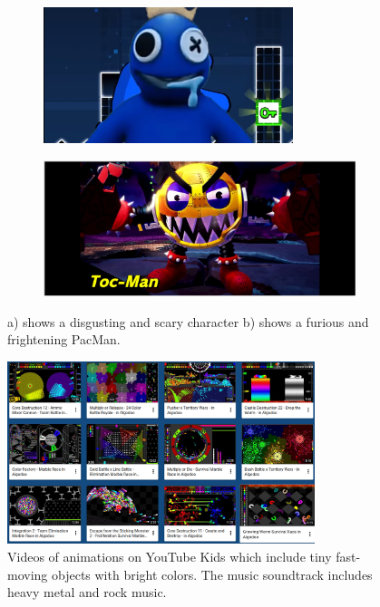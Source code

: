 \begin{figure}[!htb]
  \centering

  \begin{subfigure}{0.45\textwidth}
    \centering
    \includegraphics[width=0.8\textwidth]{figures/malicious5.png}
    \caption{}
    \label{fig:image_disgust}
  \end{subfigure}
  \hfill
  \begin{subfigure}{0.45\textwidth}
    \centering
    \includegraphics[width=\textwidth]{figures/malicious9.png}
    \caption{}
    \label{fig:image_angry}
  \end{subfigure}

  \caption{a) shows a disgusting and scary character b) shows a furious and frightening PacMan.}
  \label{fig:disgusting}
\end{figure}

\begin{figure}[!h]
    \centering
    \includegraphics[width=0.8\textwidth]{figures/maliciou3.png}
    \caption{Videos of animations on YouTube Kids which include tiny fast-moving objects with bright colors.  The music soundtrack includes heavy metal and rock music.}  
    \label{fig:model}
\end{figure}


